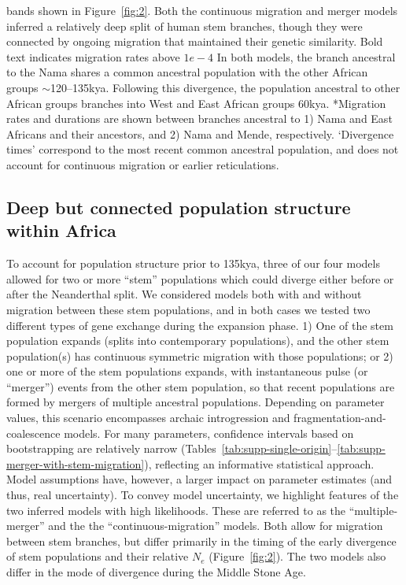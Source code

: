 \documentclass[]{article}
\begin{document}
\begin{table}[t!]
{        bands shown in Figure~\ref{fig:2}. Both the continuous migration and
        merger models inferred a relatively deep split of human stem branches,
        though they were connected by ongoing migration that maintained their
        genetic similarity. Bold text indicates migration rates above $1e-4$ 
        In both models, the branch ancestral to the Nama shares a common ancestral population 
        with the other African groups $\sim$120--135kya. Following this divergence, 
        the population ancestral to other African groups branches into West and East African
        groups 60kya. *Migration rates and durations are shown between branches ancestral to 1) Nama and East Africans
        and their ancestors, and 2) Nama and Mende, respectively.
        `Divergence times' correspond to the most recent common ancestral population, and does not account for continuous migration or earlier reticulations.
    }
    \label{tab:migration-rates}
\end{table}

\subsection*{Deep but connected population structure within Africa}

To account for population structure prior to 135kya, three of our four models allowed for two or more
``stem'' populations which could diverge either before or after the Neanderthal
split. We considered models both with and without migration between these stem
populations, and in both cases we tested two different types of gene exchange
during the expansion phase. 1) One of the stem population expands (splits into
contemporary populations), and the other stem population(s) has continuous
symmetric migration with those populations; or 2) one or more of the stem
populations expands, with instantaneous pulse (or ``merger'') events from the
other stem population, so that recent populations are formed by mergers of multiple ancestral populations. Depending on parameter values,
this scenario encompasses archaic introgression and
fragmentation-and-coalescence models. For many parameters, confidence intervals based on bootstrapping are relatively narrow
(Tables~\ref{tab:supp-single-origin}--\ref{tab:supp-merger-with-stem-migration}),
reflecting an informative statistical approach. Model assumptions
have, however, a larger impact on parameter estimates (and thus, real uncertainty). To convey model uncertainty, we
highlight features of the two inferred models with high likelihoods. These are referred to as the
``multiple-merger'' and the the ``continuous-migration'' models. Both allow for
migration between stem branches, but differ primarily in the timing of the
early divergence of stem populations and their relative $N_e$
(Figure~\ref{fig:2}). The two models also differ in the mode of divergence
during the Middle Stone Age.
\end{document}
